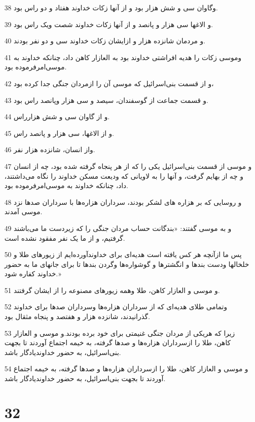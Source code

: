 \par 38 وگاوان سی و شش هزار بود و از آنها زکات خداوند هفتاد و دو راس بود.
\par 39 و الاغها سی هزار و پانصد و از آنها زکات خداوند شصت ویک راس بود.
\par 40 و مردمان شانزده هزار و ازایشان زکات خداوند سی و دو نفر بودند.
\par 41 وموسی زکات را هدیه افراشتی خداوند بود به العازار کاهن داد، چنانکه خداوند به موسی‌امرفرموده بود.
\par 42 و از قسمت بنی‌اسرائیل که موسی آن را ازمردان جنگی جدا کرده بود،
\par 43 و قسمت جماعت از گوسفندان، سیصد و سی هزار وپانصد راس بود.
\par 44 و از گاوان سی و شش هزارراس.
\par 45 و از الاغها، سی هزار و پانصد راس.
\par 46 واز انسان، شانزده هزار نفر.
\par 47 و موسی از قسمت بنی‌اسرائیل یکی را که از هر پنجاه گرفته شده بود، چه از انسان و چه از بهایم گرفت، و آنها را به لاویانی که ودیعت مسکن خداوند را نگاه می‌داشتند، داد، چنانکه خداوند به موسی‌امرفرموده بود.
\par 48 و روسایی که بر هزاره های لشکر بودند، سرداران هزاره‌ها با سرداران صدها نزد موسی آمدند.
\par 49 و به موسی گفتند: «بندگانت حساب مردان جنگی را که زیردست ما می‌باشند گرفتیم، و از ما یک نفر مفقود نشده است.
\par 50 پس ما ازآنچه هر کس یافته است هدیه‌ای برای خداوندآورده‌ایم از زیورهای طلا و خلخالها ودست بندها و انگشترها و گوشواره‌ها وگردن بندها تا برای جانهای ما به حضور خداوند کفاره شود.»
\par 51 و موسی و العازار کاهن، طلا وهمه زیورهای مصنوعه را از ایشان گرفتند.
\par 52 وتمامی طلای هدیه‌ای که از سرداران هزاره‌ها وسرداران صدها برای خداوند گذرانیدند، شانزده هزار و هفتصد و پنجاه مثقال بود.
\par 53 زیرا که هریکی از مردان جنگی غنیمتی برای خود برده بودند.و موسی و العازار کاهن، طلا را ازسرداران هزاره‌ها و صدها گرفته، به خیمه اجتماع آوردند تا بجهت بنی‌اسرائیل، به حضور خداوندیادگار باشد.
\par 54 و موسی و العازار کاهن، طلا را ازسرداران هزاره‌ها و صدها گرفته، به خیمه اجتماع آوردند تا بجهت بنی‌اسرائیل، به حضور خداوندیادگار باشد.
 
\chapter{32}

